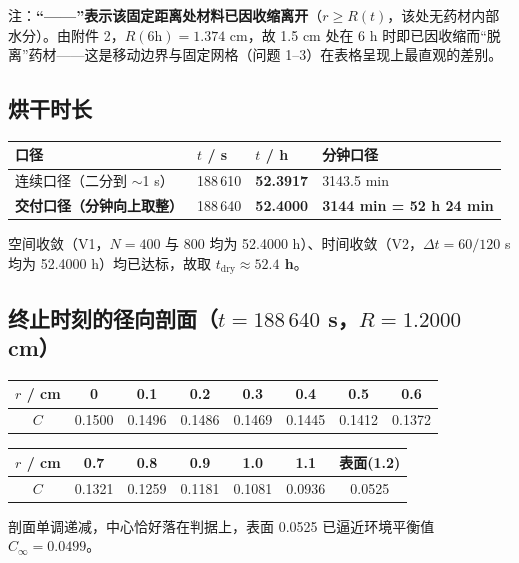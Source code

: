 \documentclass[11pt]{ctexart}
\begin{document}
注：\textbf{``——''表示该固定距离处材料已因收缩离开}（$r\ge R(t)$，该处无药材内部水分）。由附件 2，$R(6\text{h})=1.374$ cm，故 1.5 cm 处在 6 h 时即已因收缩而``脱离''药材——这是移动边界与固定网格（问题 1--3）在表格呈现上最直观的差别。

\subsection{烘干时长}

\begin{center}
\begin{tabular}{llll}
\toprule
口径 & $t$ / s & $t$ / h & 分钟口径 \\
\midrule
连续口径（二分到 $\sim$1 s） & 188\,610 & \textbf{52.3917} & 3143.5 min \\
\textbf{交付口径（分钟向上取整）} & 188\,640 & \textbf{52.4000} & \textbf{3144 min = 52 h 24 min} \\
\bottomrule
\end{tabular}
\end{center}

空间收敛（V1，$N=400$ 与 800 均为 52.4000 h）、时间收敛（V2，$\Delta t = 60/120$ s 均为 52.4000 h）均已达标，故取 \textbf{$t_\text{dry} \approx 52.4$ h}。

\subsection{终止时刻的径向剖面（$t = 188\,640$ s，$R = 1.2000$ cm）}

\begin{center}
\begin{tabular}{cccccccc}
\toprule
$r$ / cm & 0 & 0.1 & 0.2 & 0.3 & 0.4 & 0.5 & 0.6 \\
\midrule
$C$ & 0.1500 & 0.1496 & 0.1486 & 0.1469 & 0.1445 & 0.1412 & 0.1372 \\
\bottomrule
\end{tabular}
\end{center}

\begin{center}
\begin{tabular}{ccccccc}
\toprule
$r$ / cm & 0.7 & 0.8 & 0.9 & 1.0 & 1.1 & 表面(1.2) \\
\midrule
$C$ & 0.1321 & 0.1259 & 0.1181 & 0.1081 & 0.0936 & 0.0525 \\
\bottomrule
\end{tabular}
\end{center}

剖面单调递减，中心恰好落在判据上，表面 0.0525 已逼近环境平衡值 $C_\infty=0.0499$。
\end{document}
